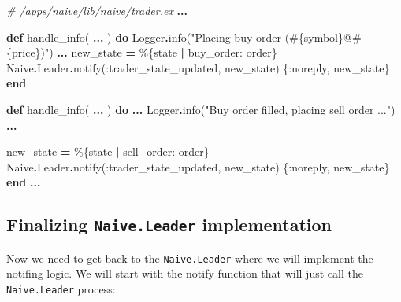 \documentclass[
]{book}
\newenvironment{Shaded}{\begin{snugshade}}{\end{snugshade}}
\newcommand{\CommentTok}[1]{\textcolor[rgb]{0.56,0.35,0.01}{\textit{#1}}}
\newcommand{\ConstantTok}[1]{\textcolor[rgb]{0.00,0.00,0.00}{#1}}
\newcommand{\KeywordTok}[1]{\textcolor[rgb]{0.13,0.29,0.53}{\textbf{#1}}}
\newcommand{\NormalTok}[1]{#1}
\newcommand{\OperatorTok}[1]{\textcolor[rgb]{0.81,0.36,0.00}{\textbf{#1}}}
\newcommand{\OtherTok}[1]{\textcolor[rgb]{0.56,0.35,0.01}{#1}}
\newcommand{\StringTok}[1]{\textcolor[rgb]{0.31,0.60,0.02}{#1}}
\newcommand{\VariableTok}[1]{\textcolor[rgb]{0.00,0.00,0.00}{#1}}
\begin{document}
\begin{Shaded}
\begin{Highlighting}[]
  \CommentTok{\# /apps/naive/lib/naive/trader.ex}
  \OperatorTok{...}

  \KeywordTok{def}\NormalTok{ handle\_info(}
        \OperatorTok{...}
\NormalTok{      ) }\KeywordTok{do}
    \ConstantTok{Logger}\OperatorTok{.}\NormalTok{info(}\StringTok{"Placing buy order (}\OtherTok{\#\{}\NormalTok{symbol}\OtherTok{\}}\StringTok{@}\OtherTok{\#\{}\NormalTok{price}\OtherTok{\}}\StringTok{)"}\NormalTok{)}
    \OperatorTok{...}
\NormalTok{    new\_state }\OperatorTok{=}\NormalTok{ \%\{state }\OperatorTok{|} \VariableTok{buy\_order:}\NormalTok{ order\}}
    \ConstantTok{Naive}\OperatorTok{.}\ConstantTok{Leader}\OperatorTok{.}\NormalTok{notify(}\VariableTok{:trader\_state\_updated}\NormalTok{, new\_state)}
\NormalTok{    \{}\VariableTok{:noreply}\NormalTok{, new\_state\}}
  \KeywordTok{end}

  \KeywordTok{def}\NormalTok{ handle\_info(}
        \OperatorTok{...}
\NormalTok{      ) }\KeywordTok{do}
    \OperatorTok{...}
    \ConstantTok{Logger}\OperatorTok{.}\NormalTok{info(}\StringTok{"Buy order filled, placing sell order ..."}\NormalTok{)  }
    \OperatorTok{...}

\NormalTok{    new\_state }\OperatorTok{=}\NormalTok{ \%\{state }\OperatorTok{|} \VariableTok{sell\_order:}\NormalTok{ order\}}
    \ConstantTok{Naive}\OperatorTok{.}\ConstantTok{Leader}\OperatorTok{.}\NormalTok{notify(}\VariableTok{:trader\_state\_updated}\NormalTok{, new\_state)}
\NormalTok{    \{}\VariableTok{:noreply}\NormalTok{, new\_state\}}
  \KeywordTok{end}
  \OperatorTok{...}
\end{Highlighting}
\end{Shaded}

\hypertarget{finalizing-naive.leader-implementation}{%
\subsection{\texorpdfstring{Finalizing \texttt{Naive.Leader} implementation}{Finalizing Naive.Leader implementation}}\label{finalizing-naive.leader-implementation}}

Now we need to get back to the \texttt{Naive.Leader} where we will implement the notifing logic. We will start with the notify function that will just call the \texttt{Naive.Leader} process:
\end{document}
